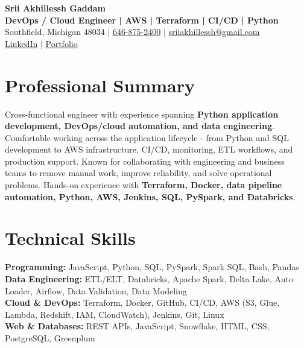 \documentclass[letterpaper,10pt]{article}
\begin{document}
\fontsize{9.35pt}{10.45pt}\selectfont

\begin{center}
    {\LARGE \textbf{Srii Akhillessh Gaddam}} \\[-1pt]
    \textbf{DevOps / Cloud Engineer | AWS | Terraform | CI/CD | Python} \\[2pt]
    Southfield, Michigan 48034 $|$
    \href{tel:6468752400}{646-875-2400} $|$
    \href{mailto:sriiakhillessh@gmail.com}{sriiakhillessh@gmail.com} \\[1pt]
    \href{https://www.linkedin.com/in/srii-akhiilessh-gaddam-b48668191/}{LinkedIn} $|$
    \href{https://sriiakhillesshg.github.io/portfolio/}{Portfolio}
\end{center}
\vspace{-8pt}

\section{Professional Summary}
\small{Cross-functional engineer with experience spanning \textbf{Python application development, DevOps/cloud automation, and data engineering}. Comfortable working across the application lifecycle - from Python and SQL development to AWS infrastructure, CI/CD, monitoring, ETL workflows, and production support. Known for collaborating with engineering and business teams to remove manual work, improve reliability, and solve operational problems. Hands-on experience with \textbf{Terraform, Docker, data pipeline automation, Python, AWS, Jenkins, SQL, PySpark, and Databricks}.}

\section{Technical Skills}
\small{
\textbf{Programming:} JavaScript, Python, SQL, PySpark, Spark SQL, Bash, Pandas \\
\textbf{Data Engineering:} ETL/ELT, Databricks, Apache Spark, Delta Lake, Auto Loader, Airflow, Data Validation, Data Modeling \\
\textbf{Cloud \& DevOps:} Terraform, Docker, GitHub, CI/CD, AWS (S3, Glue, Lambda, Redshift, IAM, CloudWatch), Jenkins, Git, Linux \\
\textbf{Web \& Databases:} REST APIs, JavaScript, Snowflake, HTML, CSS, PostgreSQL, Greenplum
}
\end{document}
